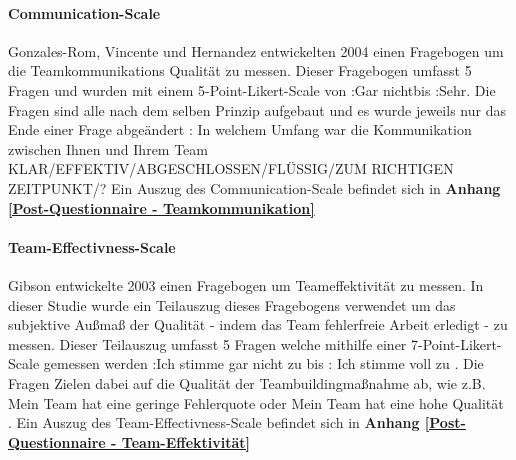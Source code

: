 \documentclass[a4paper,11pt]{article}%
\renewcommand{\\}{\vspace*{0.5\baselineskip} \newline}
\begin{document}
  


			\paragraph{Communication-Scale}
Gonzales-Rom, Vincente und Hernandez \citep[p.1049]{gonzalez2014climate}entwickelten 2004 einen Fragebogen um die Teamkommunikations Qualität zu messen. Dieser Fragebogen umfasst 5 Fragen und wurden mit einem 5-Point-Likert-Scale von :Gar nicht\frqq bis :Sehr\frqq. Die Fragen sind alle nach dem selben Prinzip aufgebaut und es wurde jeweils nur das Ende einer Frage abgeändert : \flqq In welchem Umfang war die Kommunikation zwischen Ihnen und Ihrem Team KLAR/EFFEKTIV/ABGESCHLOSSEN/FLÜSSIG/ZUM RICHTIGEN ZEITPUNKT/?\frqq 
\\Ein Auszug des Communication-Scale befindet sich in \textbf{Anhang \ref{Post-Questionnaire - Teamkommunikation}}

			\paragraph{Team-Effectivness-Scale}
Gibson \citep[p.469]{gibson2003team} entwickelte 2003 einen Fragebogen um Teameffektivität zu messen. In dieser Studie wurde ein Teilauszug dieses Fragebogens verwendet um das subjektive Außmaß der Qualität - indem das Team fehlerfreie Arbeit erledigt - zu messen. Dieser Teilauszug umfasst 5 Fragen welche mithilfe einer 7-Point-Likert-Scale gemessen werden :Ich stimme gar nicht zu \frqq bis : Ich stimme voll zu \frqq. Die Fragen Zielen dabei auf die Qualität der Teambuildingmaßnahme ab, wie z.B. \flqq Mein Team hat eine geringe Fehlerquote \frqq oder \flqq Mein Team hat eine hohe Qualität \frqq. 
\\Ein Auszug des Team-Effectivness-Scale befindet sich in \textbf{Anhang \ref{Post-Questionnaire - Team-Effektivität}}
\end{document}
